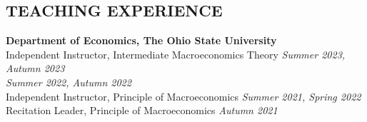 \documentclass[10pt]{res} %
\begin{document}
\begin{resume}
\vspace{-10pt}


\section{TEACHING EXPERIENCE}%
\label{sec:teaching_experience}

\vspace{8pt} %

{\bf Department of Economics, The Ohio State University} \\
Independent Instructor, Intermediate Macroeconomics Theory \hfill \textit{Summer 2023, Autumn 2023} \\
\hspace*{\fill} \textit{Summer 2022, Autumn 2022} \\
Independent Instructor, Principle of Macroeconomics \hfill  \textit{Summer 2021, Spring 2022} \\
Recitation Leader, Principle of Macroeconomics \hfill  \textit{Autumn 2021}





\end{resume}
\end{document}
